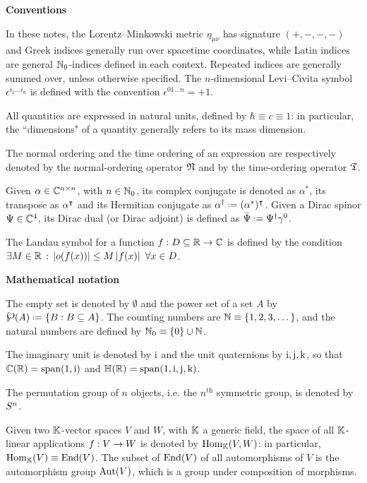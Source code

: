 
\textbf{\sffamily Conventions}

In these notes, the Lorentz--Minkowski metric $ \eta_{\mu \nu} $ has signature $ (+,-,-,-) $ and Greek indices generally run over spacetime coordinates, while Latin indices are general $ \mathbb{N}_0 $-indices defined in each context. Repeated indices are generally summed over, unless otherwise specified. The $ n $-dimensional Levi--Civita symbol $ \epsilon^{i_1 \dots i_n} $ is defined with the convention $ \epsilon^{0 1 \dots n} = +1 $.

All quantities are expressed in natural units, defined by $ \hbar \equiv c \equiv 1 $: in particular, the ``dimensions" of a quantity generally refers to its mass dimension.

The normal ordering and the time ordering of an expression are respectively denoted by the normal-ordering operator $ \mathfrak{N} $ and by the time-ordering operator $ \mathfrak{T} $.

Given $ \alpha \in \mathbb{C}^{n \times n} $, with $ n \in \mathbb{N}_0 $, its complex conjugate is denoted as $ \alpha^* $, its transpose as $ \alpha^\intercal $ and its Hermitian conjugate as $ \alpha\dg \defeq (\alpha^*)\tsp $. Given a Dirac spinor $ \Psi \in \mathbb{C}^4 $, its Dirac dual (or Dirac adjoint) is defined as $ \bar{\Psi} \defeq \Psi\dg \gamma^0 $.

The Landau symbol for a function $ f : D \subseteq \mathbb{R} \rightarrow \mathbb{C} $ is defined by the condition $ \exists M \in \mathbb{R} \,:\, \left\lvert o(f(x))\right\rvert \leq M \left\lvert f(x)\right\rvert \,\,\forall x \in D $.

\vspace{1em}

\textbf{\sffamily Mathematical notation}

The empty set is denoted by $ \emptyset $ and the power set of a set $ A $ by $ \pwst{A} \defeq \{B : B \ssq A\} $. The counting numbers are $ \mathbb{N} \equiv \{1,2,3,\dots\} $, and the natural numbers are defined by $ \mathbb{N}_0 \equiv \{0\} \cup \mathbb{N} $.

The imaginary unit is denoted by $ \mathrm{i} $ and the unit quaternions by $ \mathrm{i} , \mathrm{j} , \mathrm{k} $, so that $ \mathbb{C}(\mathbb{R}) = \operatorname{span}(1,\mathrm{i}) $ and $ \mathbb{H}(\mathbb{R}) = \operatorname{span}(1,\mathrm{i},\mathrm{j},\mathrm{k}) $.

The permutation group of $ n $ objects, i.e. the $ n^\text{th} $ symmetric group, is denoted by $ S^{n} $.

Given two $ \mathbb{K} $-vector spaces $ V $ and $ W $, with $ \mathbb{K} $ a generic field, the space of all $ \mathbb{K} $-linear applications $ f : V \rightarrow W $ is denoted by $ \operatorname{Hom}_{\mathbb{K}}(V,W) $: in particular, $ \operatorname{Hom}_{\mathbb{K}}(V) \equiv \operatorname{End}(V) $. The subset of $ \operatorname{End}(V) $ of all automorphisms of $ V $ is the automorphism group $ \operatorname{Aut}(V) $, which is a group under composition of morphisms.

